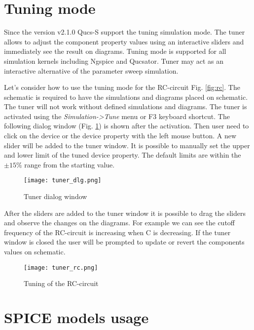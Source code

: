 \section{Tuning mode}

Since the version v2.1.0 Qucs-S support the tuning simulation mode. The tuner allows to adjust the component property values using an interactive sliders and immediately see the result on diagrams. Tuning mode is supported for all simulation kernels including Ngspice and Qucsator. Tuner may act as an interactive alternative of the parameter sweep simulation.

Let's consider how to use the tuning mode for the RC-circuit Fig. \ref{fig:rc}. The schematic is required to have the simulations and diagrams placed on schematic. The tuner will not work without defined simulations and diagrams. The tuner is activated using the \emph{Simulation->Tune} menu or F3 keyboard shortcut. The following dialog window (Fig. \ref{fig:tuner_dlg}) is shown after the activation. Then user need to click on the device or the device property with the left mouse button. A new slider will be added to the tuner window. It is possible to manually set the upper and lower limit of the tuned device property. The default limits are within the $\pm15\%$ range from the starting value.



    \begin{figure}[!ht]
    \begin{center}
        \texttt{[image: tuner\_dlg.png]}
    \end{center}
    \caption{Tuner dialog window} \label{fig:tuner_dlg}
    \end{figure}

After the sliders are added to the tuner window it is possible to drag the sliders and observe the changes on the diagrams. For example we can see the cutoff frequency of the RC-circuit is increasing when C is decreasing. If the tuner window is closed the user will be prompted to update or revert the components values on schematic.

    \begin{figure}[!ht]
    \begin{center}
        \texttt{[image: tuner\_rc.png]}
    \end{center}
    \caption{Tuning of the RC-circuit} \label{fig:tuner_rc}
    \end{figure}


\section{SPICE models usage}

